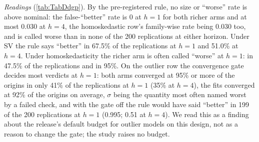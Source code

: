 \emph{Readings} (\cref{tab:TabDdgp}). By the pre-registered rule, no size or ``worse'' rate is
above nominal: the false-``better'' rate is 0 at $h = 1$ for both richer arms and at most 0.030 at
$h = 4$, the homoskedastic row's family-wise rate being 0.030 too, and  is called
worse than  in none of the 200 replications at either horizon. Under SV the rule says
``better'' in 67.5\% of the replications at $h = 1$ and 51.0\% at $h = 4$. Under homoskedasticity the
richer arm is often called ``worse'' at $h = 1$:  in 47.5\% of the replications and
 in 95\%. On the outlier row the convergence gate decides most verdicts at $h = 1$: both
arms converged at 95\% or more of the origins in only 41\% of the replications at $h = 1$ (35\% at
$h = 4$), the  fits converged at 92\% of the origins on average, $\sigma$ being
the quantity most often named worst by a failed check, and with the gate off the rule would have said ``better'' in
199 of the 200 replications at $h = 1$ (0.995; 0.51 at $h = 4$). We read this as a finding about the
release's default budget for outlier models on this design, not as a reason to change the gate; the
study raises no budget.


